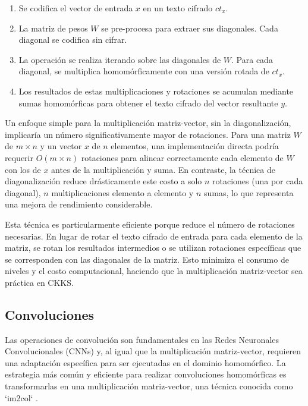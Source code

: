 \begin{enumerate}
    \item Se codifica el vector de entrada $x$ en un texto cifrado $ct_x$.
    \item La matriz de pesos $W$ se pre-procesa para extraer sus diagonales. Cada diagonal se codifica sin cifrar.
    \item La operación se realiza iterando sobre las diagonales de $W$. Para cada diagonal, se multiplica homomórficamente con una versión rotada de $ct_x$.
    \item Los resultados de estas multiplicaciones y rotaciones se acumulan mediante sumas homomórficas para obtener el texto cifrado del vector resultante $y$.
\end{enumerate}

Un enfoque simple para la multiplicación matriz-vector, sin la diagonalización, implicaría un número significativamente mayor de rotaciones. Para una matriz $W$ de $m \times n$ y un vector $x$ de $n$ elementos, una implementación directa podría requerir $O(m \times n)$ rotaciones para alinear correctamente cada elemento de $W$ con los de $x$ antes de la multiplicación y suma. En contraste, la técnica de diagonalización reduce drásticamente este costo a solo $n$ rotaciones (una por cada diagonal), $n$ multiplicaciones elemento a elemento y $n$ sumas, lo que representa una mejora de rendimiento considerable.

Esta técnica es particularmente eficiente porque reduce el número de rotaciones necesarias. En lugar de rotar el texto cifrado de entrada para cada elemento de la matriz, se rotan los resultados intermedios o se utilizan rotaciones específicas que se corresponden con las diagonales de la matriz. Esto minimiza el consumo de niveles y el costo computacional, haciendo que la multiplicación matriz-vector sea práctica en CKKS.

\subsection{Convoluciones}

Las operaciones de convolución son fundamentales en las Redes Neuronales Convolucionales (CNNs) y, al igual que la multiplicación matriz-vector, requieren una adaptación específica para ser ejecutadas en el dominio homomórfico. La estrategia más común y eficiente para realizar convoluciones homomórficas es transformarlas en una multiplicación matriz-vector, una técnica conocida como `im2col` \cite{Goodfellow16}.

